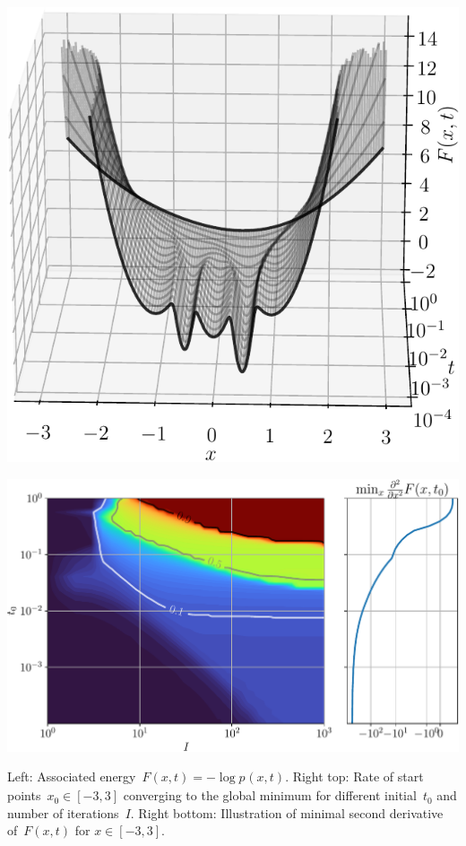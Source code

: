 \documentclass[a1paper,fleqn]{betterportraitposter}
\newcommand{\pdf}[1]{p_{#1}}
\theoremstyle{plain}
\begin{document}
{\begin{multicols}{2}
\noindent\begin{minipage}{.55\linewidth}
    \centering
    \includegraphics[width=.99\linewidth]{../figures/ex_gmm/ex_gmm_func}
\end{minipage}%
\noindent\begin{minipage}{.45\linewidth}
    \centering
    \includegraphics[width=.99\linewidth]{../figures/ex_gmm/ex_gmm_rate}
\end{minipage}
\begin{spacing}{1}
\LARGE
\LARGE
Left: Associated energy~$F(x,t)=-\log\pdf{}(x,t)$. Right top: Rate of start points~$x_0\in[-3,3]$ converging to the global minimum for different initial~$t_0$ and number of iterations~$I$. Right bottom: Illustration of minimal second derivative of~$F(x,t)$ for $x\in[-3,3]$.
\end{spacing}
\columnbreak


\end{multicols}}
\end{document}

